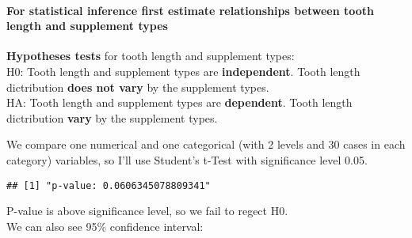 \documentclass[]{article}
\newenvironment{Shaded}{\begin{snugshade}}{\end{snugshade}}
\newcommand{\KeywordTok}[1]{\textcolor[rgb]{0.13,0.29,0.53}{\textbf{#1}}}
\newcommand{\DataTypeTok}[1]{\textcolor[rgb]{0.13,0.29,0.53}{#1}}
\newcommand{\DecValTok}[1]{\textcolor[rgb]{0.00,0.00,0.81}{#1}}
\newcommand{\FloatTok}[1]{\textcolor[rgb]{0.00,0.00,0.81}{#1}}
\newcommand{\StringTok}[1]{\textcolor[rgb]{0.31,0.60,0.02}{#1}}
\newcommand{\OtherTok}[1]{\textcolor[rgb]{0.56,0.35,0.01}{#1}}
\newcommand{\OperatorTok}[1]{\textcolor[rgb]{0.81,0.36,0.00}{\textbf{#1}}}
\newcommand{\NormalTok}[1]{#1}
\let\oldparagraph\paragraph
\renewcommand{\paragraph}[1]{\oldparagraph{#1}\mbox{}}
\begin{document}
\paragraph{For statistical inference first estimate relationships
between tooth length and supplement
types}\label{for-statistical-inference-first-estimate-relationships-between-tooth-length-and-supplement-types}

\textbf{Hypotheses tests} for tooth length and supplement types:\\
H0: Tooth length and supplement types are \textbf{independent}. Tooth
length dictribution \textbf{does not vary} by the supplement types.\\
HA: Tooth length and supplement types are \textbf{dependent}. Tooth
length dictribution \textbf{vary} by the supplement types.

We compare one numerical and one categorical (with 2 levels and 30 cases
in each category) variables, so I'll use Student's t-Test with
significance level 0.05.

\begin{Shaded}
\end{Shaded}

\begin{verbatim}
## [1] "p-value: 0.0606345078809341"
\end{verbatim}

P-value is above significance level, so we fail to regect H0.\\
We can also see 95\% confidence interval:

\begin{Shaded}
\end{Shaded}
\end{document}
